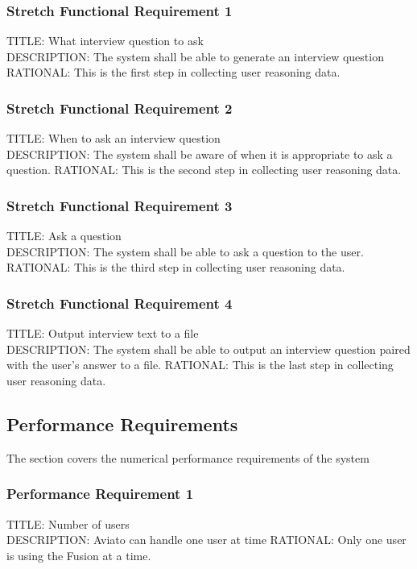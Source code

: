 \documentclass[onecolumn, draftclsnofoot,10pt, compsoc]{IEEEtran}
\def \botname{Aviato }
\begin{document}
        
        \subsubsection{Stretch Functional Requirement 1}
        TITLE: What interview question to ask \\
        DESCRIPTION: The system shall be able to generate an interview question
        RATIONAL: This is the first step in collecting user reasoning data. 
        
        
        \subsubsection{Stretch Functional Requirement 2}
        TITLE: When to ask an interview question \\
        DESCRIPTION: The system shall be aware of when it is appropriate to ask a question.
        RATIONAL: This is the second step in collecting user reasoning data. 
        
        \subsubsection{Stretch Functional Requirement 3}
        TITLE: Ask a question \\
        DESCRIPTION: The system shall be able to ask a question to the user.
        RATIONAL: This is the third step in collecting user reasoning data. 
        
        \subsubsection{Stretch Functional Requirement 4}
        TITLE: Output interview text to a file \\
        DESCRIPTION: The system shall be able to output an interview question paired with the user's answer to a file.
        RATIONAL: This is the last step in collecting user reasoning data. 
        

   		 \subsection{Performance Requirements}
    		The section covers the numerical performance requirements of the system
        
        \subsubsection{Performance Requirement 1}
        TITLE: Number  of users \\
        DESCRIPTION: \botname can handle one user at time
        RATIONAL: Only one user is using the Fusion at a time. 
        
\end{document}
